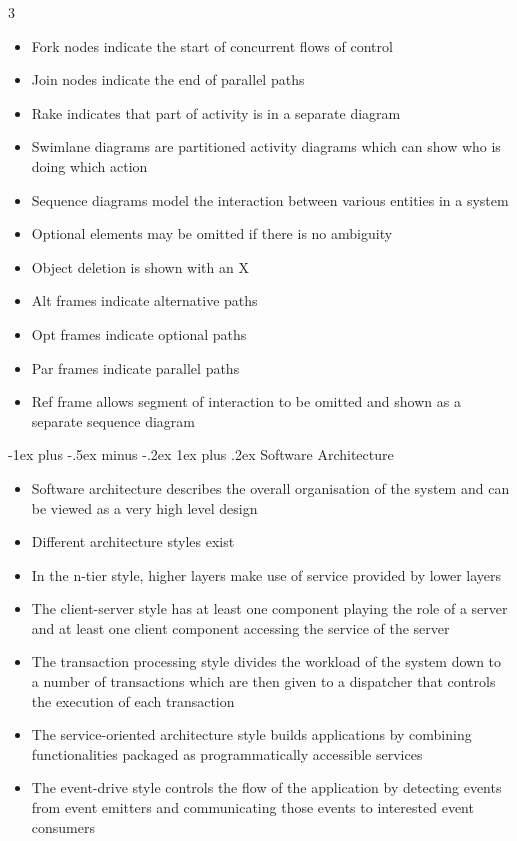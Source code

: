 \documentclass[10pt, landscape]{article}
\makeatletter
\renewcommand{\subsection}{\@startsection{subsection}{3}{0mm}%
                                {-1ex plus -.5ex minus -.2ex}%
                                {1ex plus .2ex}%
                                {\normalfont\small\bfseries}}%
\makeatother
\begin{document}
\begin{multicols*}{3}
\begin{itemize}
    \item Fork nodes indicate the start of concurrent flows of control
    \item Join nodes indicate the end of parallel paths
    \item Rake indicates that part of activity is in a separate diagram
    \item Swimlane diagrams are partitioned activity diagrams which can show who is doing which action
    \item Sequence diagrams model the interaction between various entities in a system
    \item Optional elements may be omitted if there is no ambiguity
    \item Object deletion is shown with an X
    \item Alt frames indicate alternative paths
    \item Opt frames indicate optional paths
    \item Par frames indicate parallel paths
    \item Ref frame allows segment of interaction to be omitted and shown as a separate sequence diagram
\end{itemize}

\subsection{Software Architecture}
\begin{itemize}
    \item Software architecture describes the overall organisation of the system and can be viewed as a very high level design
    \item Different architecture styles exist
    \item In the n-tier style, higher layers make use of service provided by lower layers
    \item The client-server style has at least one component playing the role of a server and at least one client component accessing the service of the server
    \item The transaction processing style divides the workload of the system down to a number of transactions which are then given to a dispatcher that controls the execution of each transaction
    \item The service-oriented architecture style builds applications by combining functionalities packaged as programmatically accessible services
    \item The event-drive style controls the flow of the application by detecting events from event emitters and communicating those events to interested event consumers
\end{itemize}


\end{multicols*}
\end{document}
